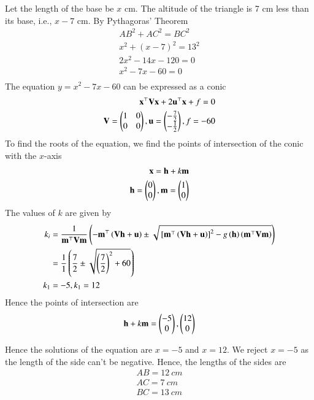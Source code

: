 \documentclass[journal]{IEEEtran}
\begin{document}
Let the length of the base be $x$ cm. The altitude of the triangle is 7 cm less than its base, i.e.,
$x - 7$ cm. By Pythagoras' Theorem
\begin{align}
    AB^2 + AC^2 = BC^2 \\
    x^2 + (x - 7)^2 = 13^2 \\
    2x^2 - 14x - 120 = 0 \\
    x^2 - 7x - 60 = 0 \\
\end{align}
The equation $y = x^2 - 7x - 60$ can be expressed as a conic
\begin{align}
    \mathbf{x}^\top\mathbf{V}\mathbf{x} + 2\mathbf{u}^\top\mathbf{x} + f = 0 \\
    \mathbf{V} = \begin{pmatrix}1 & 0 \\ 0 & 0\end{pmatrix}, \mathbf{u} = \begin{pmatrix}-\frac{7}{2} \\ -\frac{1}{2}\end{pmatrix}, f = -60
\end{align}
To find the roots of the equation, we find the points of intersection of the 
conic with the $x$-axis
\begin{align}
    \mathbf{x} = \mathbf{h} + k\mathbf{m} \\
    \mathbf{h} = \begin{pmatrix}0 \\ 0\end{pmatrix}, \mathbf{m} = \begin{pmatrix}1 \\ 0\end{pmatrix}
\end{align}
The values of $k$ are given by
\begin{align}
    k_i &= \frac{1}{\mathbf{m}^\top\mathbf{V}\mathbf{m}}\left(-\mathbf{m}^\top\left(\mathbf{V\mathbf{h} + \mathbf{u}}\right) \pm \sqrt{
        {}\left[\mathbf{m}^\top\left(\mathbf{V}\mathbf{h} + \mathbf{u}\right)\right]^2 - g\left(\mathbf{h}\right)\left(\mathbf{m}^\top\mathbf{V}\mathbf{m}\right)
    }\right) \\
    &= \frac{1}{1} \left(\frac{7}{2} \pm \sqrt{\left(\frac{7}{2}\right)^2 + 60}\right) \\
    k_1 &= -5, k_1 = 12
\end{align}
Hence the points of intersection are
\begin{align}
    \mathbf{h} + k\mathbf{m} = \begin{pmatrix}-5 \\ 0\end{pmatrix}, \begin{pmatrix}12 \\ 0\end{pmatrix}
\end{align}

Hence the solutions of the equation are $x = -5$ and $x = 12$. We reject $x = -5$ as the length of the side
can't be negative. Hence, the lengths of the sides are
\begin{align}
    AB = 12\ cm \\
    AC = 7\ cm \\
    BC = 13\ cm
\end{align}
\end{document}
